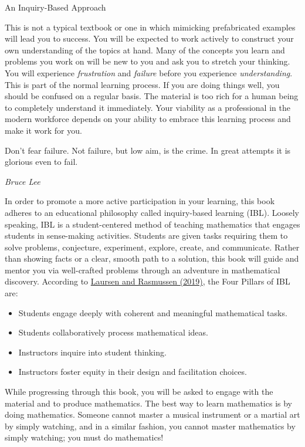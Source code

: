 \begin{section}{An Inquiry-Based Approach}

This is not a typical textbook or one in which mimicking prefabricated examples will lead you to success. You will be expected to work actively to construct your own understanding of the topics at hand. 
Many of the concepts you learn and problems you work on will be new to you and ask you to stretch your thinking. You will experience \emph{frustration} and \emph{failure} before you experience \emph{understanding}. This is part of the normal learning process. If you are doing things well, you should be confused on a regular basis. The material is too rich for a human being to completely understand it immediately. Your viability as a professional in the modern workforce depends on your ability to embrace this learning process and make it work for you.

\epigraph{Don't fear failure.  Not failure, but low aim, is the crime. In great attempts it is glorious even to fail.}{\emph{Bruce Lee}}

In order to promote a more active participation in your learning, this book adheres to an educational philosophy called inquiry-based learning (IBL).  Loosely speaking, IBL is a student-centered method of teaching mathematics that engages students in sense-making activities.  Students are given tasks requiring them to solve problems, conjecture, experiment, explore, create, and communicate.  Rather than showing facts or a clear, smooth path to a solution, this book will guide and mentor you via well-crafted problems through an adventure in mathematical discovery.  According to \href{https://www.colorado.edu/eer/sites/default/files/attached-files/laursenrasmussencommentaryauthorversion0219.pdf}{Laursen and Rasmussen (2019)}, the Four Pillars of IBL are:
\begin{itemize}
\item Students engage deeply with coherent and meaningful mathematical tasks.
\item Students collaboratively process mathematical ideas.
\item Instructors inquire into student thinking.
\item Instructors foster equity in their design and facilitation choices.
\end{itemize}

While progressing through this book, you will be asked to engage with the material and to produce mathematics. The best way to learn mathematics is by doing mathematics.  Someone cannot master a musical instrument or a martial art by simply watching, and in a similar fashion, you cannot master mathematics by simply watching; you must do mathematics!


\end{section}
